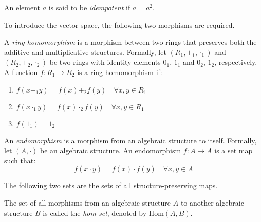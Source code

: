 \documentclass[
	11pt, %
	fleqn, %
	a4paper, %
]{LegrandOrangeBook}
\newcommand{\Hom}{\text{Hom}} %
\begin{document}
\begin{definition}
    An element $a$ is said to be \emph{idempotent} if $a = a^2$.
\end{definition}

\newpage

To introduce the vector space, the following two morphisms are required.

\begin{definition}
    A \emph{ring homomorphism} is a morphism between two rings that preserves both the additive and multiplicative structures. Formally, let $(R_1, +_1, \cdot_1)$ and $(R_2, +_2, \cdot_2)$ be two rings with identity elements $0_1$, $1_1$ and $0_2$, $1_2$, respectively. A function $f: R_1 \to R_2$ is a ring homomorphism if:
    \begin{enumerate}
        \item $f(x +_1 y) = f(x) +_2 f(y) \quad \forall x, y \in R_1$
        \item $f(x \cdot_1 y) = f(x) \cdot_2 f(y) \quad \forall x, y \in R_1$
        \item $f(1_1) = 1_2$
    \end{enumerate}    
\end{definition}

\begin{definition}[Endomorphism]
    An \emph{endomorphism} is a morphism from an algebraic structure to itself. Formally, let $(A, \cdot)$ be an algebraic structure. An endomorphism $f: A \to A$ is a set map such that:
    \[
        f(x \cdot y) = f(x) \cdot f(y) \quad \forall x, y \in A
    \]
\end{definition}

The following two sets are the sets of all structure-preserving maps.

\begin{definition}
    The set of all morphisms from an algebraic structure $A$ to another algebraic structure $B$ is called the \emph{hom-set}, denoted by $\Hom(A, B)$. 
\end{definition}
\end{document}
